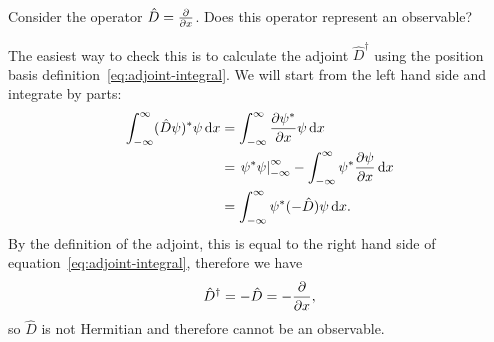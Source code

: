 \documentclass[../quantum_mechanics.tex]{subfiles}
\begin{document}
            \begin{example}
                Consider the operator $\hat{D}=\pdv{}{x}$. Does this operator represent an observable?

                The easiest way to check this is to calculate the adjoint $\hat{D}^\dagger$ using the position basis definition~\ref{eq:adjoint-integral}.
                We will start from the left hand side and integrate by parts:
                \begin{align}
                    \int_{-\infty}^\infty(\hat{D}\psi)^\ast\psi\dd{x}&=\int_{-\infty}^\infty\pdv{\psi^\ast}{x}\psi\dd{x}\\
                    &=\left.\psi^\ast\psi\right|_{-\infty}^\infty-\int_{-\infty}^\infty\psi^\ast\pdv{\psi}{x}\dd{x}\\
                    &=\int_{-\infty}^\infty\psi^\ast(-\hat{D})\psi\dd{x}.
                \end{align}
                By the definition of the adjoint, this is equal to the right hand side of equation~\ref{eq:adjoint-integral}, therefore we have
                \begin{equation}
                    \hat{D}^\dagger=-\hat{D}=-\pdv{}{x},
                \end{equation}
                so $\hat{D}$ is not Hermitian and therefore cannot be an observable.
            \end{example}
\end{document}

